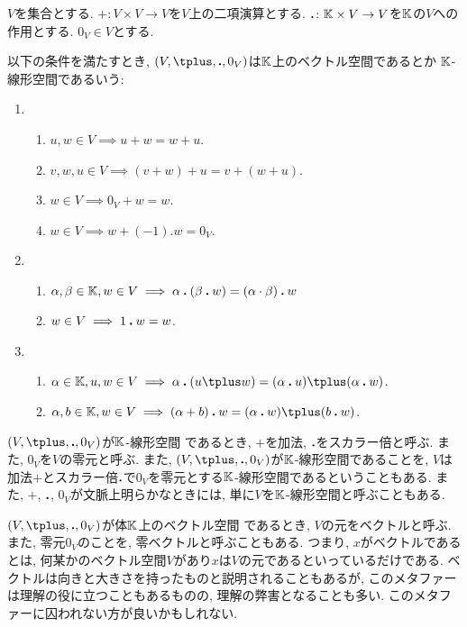 \begin{definition}
  $V$を集合とする.
  $\plus\colon V\times V \to V$を$V$上の二項演算とする.
  $\mathbin{\boldsymbol{.}} \colon \mathbb{K}\times V \to V$を$\mathbb{K}$の$V$への作用とする.
  $0_V \in V$とする.

  以下の条件を満たすとき,
  $(V,\plus,\act ,0_V)$は$\mathbb{K}$上のベクトル空間であるとか
  $\mathbb{K}$-線形空間であるいう:
  \begin{enumerate}
  \item 
    \begin{enumerate}
    \item $u,w \in V\implies  u\plus w=w\plus u$.
    \item
      \label{def:vecsp:item:sum:ass}
      $v,w,u\in V \implies (v\plus w)\plus u=v\plus (w\plus u)$.
    \item $w\in V \implies 0_V\plus w=w$.
    \item $w\in V\implies w\plus (-1).w=0_V$.%
    \end{enumerate}
  \item
    \begin{enumerate}
    \item
      \label{def:vecsp:item:prod:ass}
      $\alpha,\beta\in\mathbb{K}, w\in V \implies \alpha\mathbin{\boldsymbol{.}} (\beta \mathbin{\boldsymbol{.}} w)=(\alpha\cdot \beta)\mathbin{\boldsymbol{.}} w$
    \item $w\in V \implies 1\mathbin{\boldsymbol{.}} w=w$.
    \end{enumerate}
  \item
    \begin{enumerate}
    \item $\alpha\in \KK,u,w\in V \implies \alpha\act (u\plus w)=(\alpha\act u)\plus (\alpha\act w)$.
    \item $\alpha,b\in\KK, w\in V\implies (\alpha+b)\act w=(\alpha\act w)\plus (b\act w)$.
    \end{enumerate}
  \end{enumerate}
\end{definition}
\begin{remark}
  $(V,\plus,\act ,0_V)$が$\mathbb{K}$-線形空間
  であるとき,
  $\plus$を加法, $\mathbin{\boldsymbol{.}} $をスカラー倍と呼ぶ.
  また, $0_V$を$V$の零元と呼ぶ.
  また, 
  $(V,\plus,\act ,0_V)$が$\mathbb{K}$-線形空間であることを,
  $V$は加法$\plus$とスカラー倍$\mathbin{\boldsymbol{.}} $で$0_V$を零元とする$\mathbb{K}$-線形空間であるということもある.
  また, $\plus$, $\mathbin{\boldsymbol{.}} $, $0_V$が文脈上明らかなときには,
  単に$V$を$\mathbb{K}$-線形空間と呼ぶこともある.
\end{remark}
\begin{remark}
  $(V,\plus,\act ,0_V)$が体$\mathbb{K}$上のベクトル空間
  であるとき,
  $V$の元をベクトルと呼ぶ.
  また, 零元$0_V$のことを, 零ベクトルと呼ぶこともある.
つまり,
$x$がベクトルであるとは,
何某かのベクトル空間$V$があり$x$は$V$の元であるといっているだけである.
ベクトルは向きと大きさを持ったものと説明されることもあるが,
このメタファーは理解の役に立つこともあるものの,
理解の弊害となることも多い.
このメタファーに囚われない方が良いかもしれない.
\end{remark}

